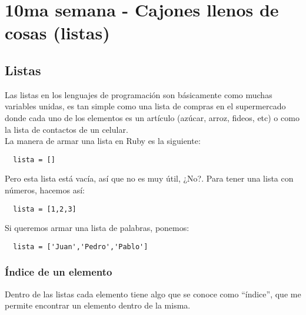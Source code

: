 \chapter{10ma semana - Cajones llenos de cosas (listas)}



\section{Listas}
Las listas en los lenguajes de programación son básicamente como muchas variables unidas, es tan simple como una lista de compras en el supermercado donde cada uno de los elementos es un artículo (azúcar, arroz, fideos, etc) o como la lista de contactos de un celular.\\

La manera de armar una lista en Ruby es la siguiente:

\begin{lstlisting}
  lista = []
\end{lstlisting}

Pero esta lista está vacía, así que no es muy útil, ¿No?. Para tener una lista con números, hacemos así:
\begin{lstlisting}
  lista = [1,2,3]
\end{lstlisting}

Si queremos armar una lista de palabras, ponemos:
\begin{lstlisting}
  lista = ['Juan','Pedro','Pablo']
\end{lstlisting}

\subsection{Índice de un elemento}
Dentro de las listas cada elemento tiene algo que se conoce como “índice”, que me permite encontrar un elemento dentro de la misma.\\

